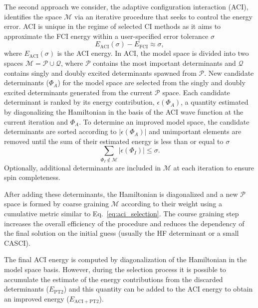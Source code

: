 \documentclass[aip,jcp,amsmath,amssymb, reprint]{revtex4-1}
\begin{document}
The second approach we consider, the adaptive configuration interaction (ACI),\cite{Schriber2016Adaptive, Schriber2017Adaptive} identifies the space $\mathcal{M}$ via an iterative procedure that seeks to control the energy error.
ACI is unique in the regime of selected CI methods as it aims to approximate the FCI energy within a user-specified error tolerance $\sigma$
\begin{equation}
E_{\text{ACI}}(\sigma) - E_{\text{FCI}} \approx \sigma,
\end{equation}
where $E_{\text{ACI}}(\sigma)$ is the ACI energy.
In ACI, the model space is divided into two spaces $\mathcal{M} = \mathcal{P} \cup \mathcal{Q}$, where $\mathcal{P}$ contains the most important determinants and $\mathcal{Q}$ contains singly and doubly excited determinants spawned from $\mathcal{P}$.
New candidate determinants ($\Phi_{A}$) for the model space are selected from the singly and doubly excited determinants generated from the current $\mathcal{P}$ space. Each candidate determinant is ranked by its energy contribution, $\epsilon(\Phi_{A})$, a quantity estimated by diagonalizing the Hamiltonian in the basis of the ACI wave function at the current iteration and $\Phi_{A}$.
To determine an improved model space, the candidate determinants are sorted according to $|\epsilon(\Phi_{A})|$ and unimportant elements are removed until the sum of their estimated energy is less than or equal to $\sigma$
\begin{equation}
\label{eq:aci_selection}
\sum_{\Phi_{I} \notin \mathcal{M}} | \epsilon(\Phi_{I}) | \leq \sigma.
\end{equation}
Optionally, additional determinants are included in $\mathcal{M}$ at each iteration to ensure spin completeness.

After adding these determinants, the Hamiltonian is diagonalized and a new $\mathcal{P}$ space is formed by coarse graining $\mathcal{M}$ according to their weight using a cumulative metric similar to Eq.~\eqref{eq:aci_selection}.
The course graining step increases the overall efficiency of the procedure and reduces the dependency of the final solution on the initial guess (usually the HF determinant or a small CASCI).

The final ACI energy is computed by diagonalization of the Hamiltonian in the model space basis. However, during the selection process it is possible to accumulate the estimate of the energy contributions from the discarded determinants ($E_\mathrm{PT2}$) and this quantity can be added to the ACI energy to obtain an improved energy ($E_\mathrm{ACI+PT2}$).
\end{document}
